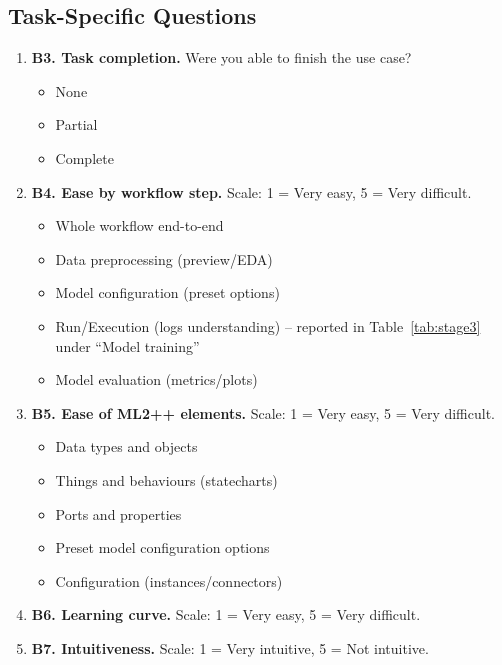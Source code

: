 \subsection{Task-Specific Questions}
\label{app:stage3_task_questions}

\begin{enumerate}[leftmargin=*]
    \item \textbf{B3. Task completion.}
    Were you able to finish the use case?
    \begin{itemize}
        \item None
        \item Partial
        \item Complete
    \end{itemize}

    \item \textbf{B4. Ease by workflow step.}
    Scale: 1 = Very easy, 5 = Very difficult.
    \begin{itemize}
        \item Whole workflow end-to-end
        \item Data preprocessing (preview/EDA)
        \item Model configuration (preset options)
        \item Run/Execution (logs understanding) -- reported in Table~\ref{tab:stage3} under ``Model training''
        \item Model evaluation (metrics/plots)
    \end{itemize}

    \item \textbf{B5. Ease of ML2++ elements.}
    Scale: 1 = Very easy, 5 = Very difficult.
    \begin{itemize}
        \item Data types and objects
        \item Things and behaviours (statecharts)
        \item Ports and properties
        \item Preset model configuration options
        \item Configuration (instances/connectors)
    \end{itemize}

    \item \textbf{B6. Learning curve.}
    Scale: 1 = Very easy, 5 = Very difficult.

    \item \textbf{B7. Intuitiveness.}
    Scale: 1 = Very intuitive, 5 = Not intuitive.


\end{enumerate}
